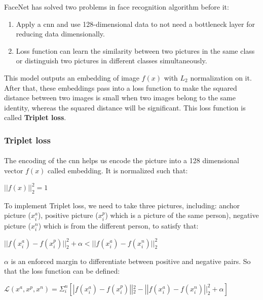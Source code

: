 FaceNet has solved two problems in face recognition algorithm before it:
\begin{enumerate}
    \item Apply a \acrshort{cnn} and use 128-dimensional data to not need a bottleneck layer for reducing data dimensionally.
    \item Loss function can learn the similarity between two pictures in the same class or distinguish two pictures in different classes simultaneously.
\end{enumerate}

This model outputs an embedding of image $f(x)$ with $L_2$ normalization on it. After that, these embeddings pass into a loss function to make the squared distance between two images is small when two images belong to the same identity, whereas the squared distance will be significant. This loss function is called \textbf{Triplet loss}. 

\subsubsection{Triplet loss}
\label{tripletLoss}
\paragraph{}
The encoding of the \acrlong{cnn} helps us encode the picture into a 128 dimensional vector $f(x)$ called embedding. It is normalized such that:

\begin{center}
    $||f(x)||^2_2=1$
\end{center}

To implement Triplet loss, we need to take three pictures, including: anchor picture ($x^a_i$), positive picture ($x^p_i$) which is a picture of the same person), negative picture ($x^n_i$) which is from the different person, to satisfy that:

\begin{center}
    $||f(x^a_i) - f(x^p_i)||^2_2 + \alpha < ||f(x^a_i) - f(x^n_i)||^2_2$
\end{center}

$\alpha$ is an enforced margin to differentiate between positive and negative pairs. So that the loss function can be defined:

\begin{center}
    $\mathcal{L}(x^a,x^p,x^n)=\Sigma^n_i[|f(x^a_i) - f(x^p_i)||^2_2 - ||f(x^a_i) - f(x^n_i)||^2_2 + \alpha]$
\end{center}

